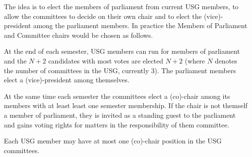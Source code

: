 The idea is to elect the members of parliament from current USG members, to allow the committees to decide on their own chair and to elect the (vice)-president among the parliament members.
In practice the Members of Parliament and Committee chairs would be chosen as follows. 

At the end of each semester, USG members can run for members of parliament and the $N+2$ candidates with most votes are elected $N+2$ (where $N$ denotes the number of committees in the USG, currently 3). 
The parliament members elect a (vice)-president among themselves. 

At the same time each semester the committees elect a (co)-chair among its members with at least least one semester membership. If the chair is not themself a member of parliament, they is invited as a standing guest to the parliament and gains voting rights for matters in the responsibility of them committee. 

Each USG member may have at most one (co)-chair position in the USG committees.